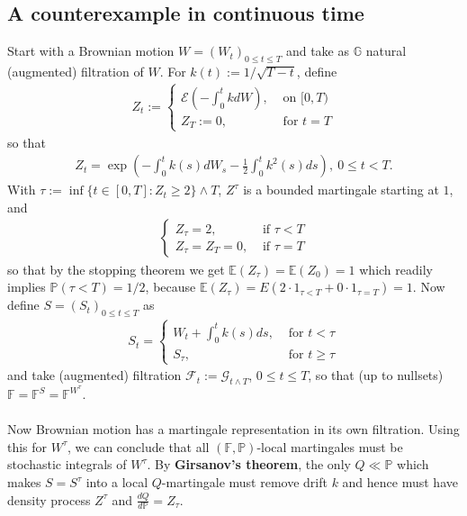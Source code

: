 \documentclass[12pt,a4paper, twoside]{article}
\theoremstyle{definition}
\newcommand{\EE}{\mathbb{E}} %
\newcommand{\PP}{\mathbb{P}} %
\begin{document}
\subsection{A counterexample in continuous time}
Start with a Brownian motion $W=(W_t)_{0 \leq t \leq T}$ and take as $\mathbb{G}$ natural (augmented) filtration of $W$. For $k(t):= 1/\sqrt{T-t}$, define 
\begin{align*}
Z_t := \begin{cases} \mathcal{E} \left( - \int_0^t k dW \right), & \text{ on } [0,T) \\ Z_T:= 0, & \text{ for } t=T
\end{cases}
\end{align*}
so that 
\begin{align*}
Z_t = \exp \left( - \int_0^t k(s) dW_s - \frac{1}{2} \int_0^t k^2 (s) ds \right),  \ 0 \leq t < T.
\end{align*}
With $\tau := \inf \{ t \in [0,T] : Z_t \geq 2 \} \wedge T$, $Z^\tau$ is a bounded martingale starting at $1$, and 
\begin{align*}
\begin{cases} Z_ \tau = 2, & \text{ if } \tau < T \\
Z_\tau = Z_T=0, & \text{ if } \tau = T
\end{cases}
\end{align*}
so that by the stopping theorem we get $\EE(Z_\tau) = \EE(Z_0)=1$ which readily implies $\mathbb{P}( \tau < T)=1/2$, because $\EE(Z_\tau)= E(2\cdot 1_{\tau < T} + 0 \cdot 1_{ \tau = T})=1$. Now define $S=(S_t)_{0 \leq t \leq T}$ as 
\begin{align*}
S_t = \begin{cases} W_t + \int_0^t k(s) ds, & \text{ for } t < \tau \\ S_\tau, & \text{ for } t \geq \tau \end{cases}
\end{align*}
and take (augmented) filtration $\mathcal{F}_t:= \mathcal{G}_{t \wedge T}$, $0 \leq t \leq T$, so that (up to nullsets) $\mathbb{F}= \mathbb{F}^S = \mathbb{F}^{W^\tau}$. \\
\\
Now Brownian motion has a martingale representation in its own filtration. Using this for $W^\tau$, we can conclude that all $( \mathbb{F}, \PP)$-local martingales must be stochastic integrals of $W^\tau$. By \textbf{Girsanov's theorem}, the only $Q \ll \PP$ which makes $S= S^\tau$ into a local $Q$-martingale must remove drift $k$ and hence must have density process $Z^\tau$ and $ \frac{dQ}{d\PP}= Z_\tau$. \\
\end{document}

